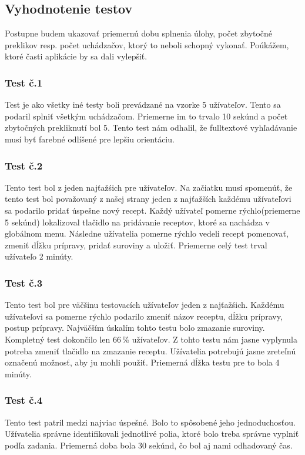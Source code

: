 \documentclass[12pt,a4paper,titlepage,final]{article}
\begin{document}
\subsection{Vyhodnotenie testov}
Postupne budem ukazovať priemernú dobu splnenia úlohy, počet zbytočné preklikov resp. počet uchádzačov, ktorý to neboli schopný vykonať. Poúkážem, ktoré časti aplikácie by sa dali vylepšiť.

\subsubsection{Test č.1}
Test je ako všetky iné testy boli prevádzané na vzorke 5 užívateľov. Tento sa podaril splniť všetkým uchádzačom. Priemerne im to trvalo 10 sekúnd a počet zbytočných prekliknutí bol 5. Tento test nám odhalil, že fulltextové vyhľadávanie musí byť farebné odlíšené pre lepšiu orientáciu.

\subsubsection{Test č.2}
Tento test bol z jeden najťažśich pre užívateľov. Na začiatku musí spomenúť, že tento test bol považovaný  z našej strany jeden z najťažších každému užívateľovi sa podarilo pridať úspešne nový recept. Každý užívateľ pomerne rýchlo(priemerne 5 sekúnd) lokalizoval tlačidlo na pridávanie receptov, ktoré sa nachádza v globálnom menu. Následne užívatelia pomerne rýchlo vedeli recept pomenovať, zmeniť dĺžku prípravy, pridať suroviny a uložiť. Priemerne celý test trval užívateľo 2 minúty.


\subsubsection{Test č.3}
Tento test bol pre väčšinu testovacích užívateľov jeden z najťažśich. Každému užívateľovi sa pomerne rýchlo podarilo zmeniť názov receptu, dĺžku prípravy, postup prípravy. Najväčším úskalím tohto testu bolo zmazanie suroviny. Kompletný test dokončilo len 66\,\% užívateľov.
Z tohto testu nám jasne vyplynula potreba zmeniť tlačidlo na zmazanie receptu. Užívatelia potrebujú jasne zreteľnú označenú možnosť, aby ju mohli použiť. Priemerná dĺžka testu pre to bola 4 minúty.

\subsubsection{Test č.4} 
Tento test patril medzi najviac úspešné. Bolo to spôsobené jeho jednoduchosťou. Užívatelia správne identifikovali jednotlivé polia, ktoré bolo treba správne vyplniť podľa zadania. Priemerná doba bola 30 sekúnd, čo bol aj nami odhadovaný čas.
\end{document}
